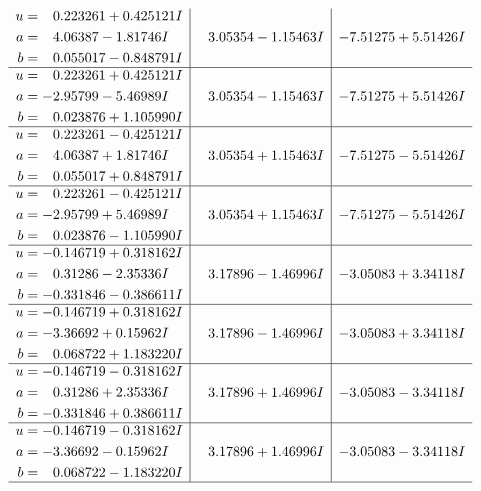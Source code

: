 \documentclass[1p]{elsarticle_modified}
\theoremstyle{definition}
\begin{document}
$$\begin{array}{c|c|c}
\begin{aligned}
u &= \phantom{-}0.223261 + 0.425121 I \\
a &= \phantom{-}4.06387 - 1.81746 I \\
b &= \phantom{-}0.055017 - 0.848791 I\end{aligned}
 & \phantom{-}3.05354 - 1.15463 I & -7.51275 + 5.51426 I \\ \hline\begin{aligned}
u &= \phantom{-}0.223261 + 0.425121 I \\
a &= -2.95799 - 5.46989 I \\
b &= \phantom{-}0.023876 + 1.105990 I\end{aligned}
 & \phantom{-}3.05354 - 1.15463 I & -7.51275 + 5.51426 I \\ \hline\begin{aligned}
u &= \phantom{-}0.223261 - 0.425121 I \\
a &= \phantom{-}4.06387 + 1.81746 I \\
b &= \phantom{-}0.055017 + 0.848791 I\end{aligned}
 & \phantom{-}3.05354 + 1.15463 I & -7.51275 - 5.51426 I \\ \hline\begin{aligned}
u &= \phantom{-}0.223261 - 0.425121 I \\
a &= -2.95799 + 5.46989 I \\
b &= \phantom{-}0.023876 - 1.105990 I\end{aligned}
 & \phantom{-}3.05354 + 1.15463 I & -7.51275 - 5.51426 I \\ \hline\begin{aligned}
u &= -0.146719 + 0.318162 I \\
a &= \phantom{-}0.31286 - 2.35336 I \\
b &= -0.331846 - 0.386611 I\end{aligned}
 & \phantom{-}3.17896 - 1.46996 I & -3.05083 + 3.34118 I \\ \hline\begin{aligned}
u &= -0.146719 + 0.318162 I \\
a &= -3.36692 + 0.15962 I \\
b &= \phantom{-}0.068722 + 1.183220 I\end{aligned}
 & \phantom{-}3.17896 - 1.46996 I & -3.05083 + 3.34118 I \\ \hline\begin{aligned}
u &= -0.146719 - 0.318162 I \\
a &= \phantom{-}0.31286 + 2.35336 I \\
b &= -0.331846 + 0.386611 I\end{aligned}
 & \phantom{-}3.17896 + 1.46996 I & -3.05083 - 3.34118 I \\ \hline\begin{aligned}
u &= -0.146719 - 0.318162 I \\
a &= -3.36692 - 0.15962 I \\
b &= \phantom{-}0.068722 - 1.183220 I\end{aligned}
 & \phantom{-}3.17896 + 1.46996 I & -3.05083 - 3.34118 I\\
 \hline 
 \end{array}$$\newpage\newpage\renewcommand{\arraystretch}{1}
\end{document}

